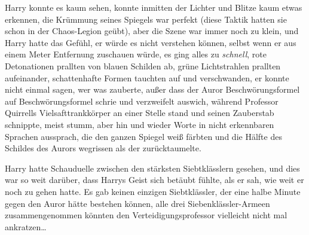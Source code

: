 Harry konnte es kaum sehen, konnte inmitten der Lichter und Blitze kaum etwas erkennen, die Krümmung seines Spiegels war perfekt (diese Taktik hatten sie schon in der Chaos-Legion geübt), aber die Szene war immer noch zu klein, und Harry hatte das Gefühl, er würde es nicht verstehen können, selbst wenn er aus einem Meter Entfernung zuschauen würde, es ging alles zu \emph{schnell}, rote Detonationen prallten von blauen Schilden ab, grüne Lichtstrahlen prallten aufeinander, schattenhafte Formen tauchten auf und verschwanden, er konnte nicht einmal sagen, wer was zauberte, außer dass der Auror Beschwörungsformel auf Beschwörungsformel schrie und verzweifelt auswich, während Professor Quirrells Vielsafttrankkörper an einer Stelle stand und seinen Zauberstab schnippte, meist stumm, aber hin und wieder Worte in nicht erkennbaren Sprachen aussprach, die den ganzen Spiegel weiß färbten und die Hälfte des Schildes des Aurors wegrissen als der zurücktaumelte.

Harry hatte Schauduelle zwischen den stärksten Siebtklässlern gesehen, und dies war so weit darüber, dass Harrys Geist sich betäubt fühlte, als er sah, wie weit er noch zu gehen hatte. Es gab keinen einzigen Siebtklässler, der eine halbe Minute gegen den Auror hätte bestehen können, alle drei Siebenklässler-Armeen zusammengenommen könnten den Verteidigungsprofessor vielleicht nicht mal ankratzen…


